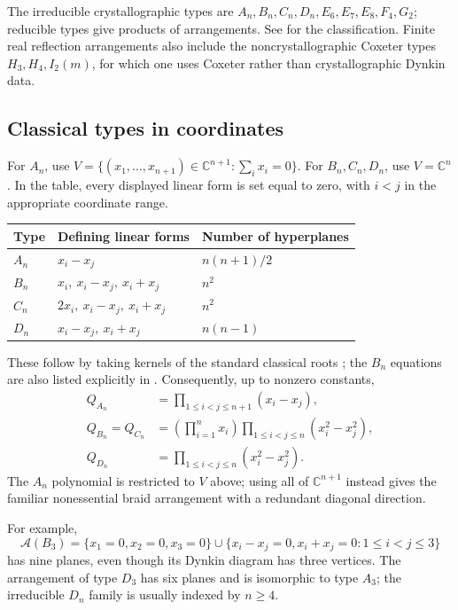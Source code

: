 \documentclass[11pt,a4paper]{article}
\theoremstyle{remark}\newtheorem{remark}[theorem]{Remark}
\newcommand{\C}{\mathbb C}
\newcommand{\A}{\mathcal A}
\begin{document}
The irreducible crystallographic types are
$A_n,B_n,C_n,D_n,E_6,E_7,E_8,F_4,G_2$; reducible types give products
of arrangements.  See \cite[Theorem 23.7]{Etingof} for the classification.
Finite real reflection arrangements also include the noncrystallographic
Coxeter types $H_3,H_4,I_2(m)$, for which one uses Coxeter rather than
crystallographic Dynkin data.

\subsection*{Classical types in coordinates}
For $A_n$, use
$V=\{(x_1,\ldots,x_{n+1})\in\C^{n+1}:\sum_i x_i=0\}$.
For $B_n,C_n,D_n$, use $V=\C^n$.  In the table, every displayed linear
form is set equal to zero, with $i<j$ in the appropriate coordinate range.
\begin{center}
\renewcommand{\arraystretch}{1.2}
\begin{tabular}{lll}
\toprule
Type & Defining linear forms & Number of hyperplanes\\
\midrule
$A_n$ & $x_i-x_j$ & $n(n+1)/2$\\
$B_n$ & $x_i,\ x_i-x_j,\ x_i+x_j$ & $n^2$\\
$C_n$ & $2x_i,\ x_i-x_j,\ x_i+x_j$ & $n^2$\\
$D_n$ & $x_i-x_j,\ x_i+x_j$ & $n(n-1)$\\
\bottomrule
\end{tabular}
\end{center}
These follow by taking kernels of the standard classical roots
\cite[\S20.3]{Etingof}; the $B_n$ equations are also listed explicitly
in \cite{M2B}.  Consequently, up to nonzero constants,
\begin{align*}
Q_{A_n}&=\prod_{1\le i<j\le n+1}(x_i-x_j),\\
Q_{B_n}=Q_{C_n}&=\left(\prod_{i=1}^n x_i\right)
                 \prod_{1\le i<j\le n}(x_i^2-x_j^2),\\
Q_{D_n}&=\prod_{1\le i<j\le n}(x_i^2-x_j^2).
\end{align*}
The $A_n$ polynomial is restricted to $V$ above; using all of
$\C^{n+1}$ instead gives the familiar nonessential braid arrangement
with a redundant diagonal direction.

For example,
\[
\A(B_3)=\{x_1=0,x_2=0,x_3=0\}
\cup\{x_i-x_j=0,x_i+x_j=0:1\le i<j\le3\}
\]
has nine planes, even though its Dynkin diagram has three vertices.
The arrangement of type $D_3$ has six planes and is isomorphic to
type $A_3$; the irreducible $D_n$ family is usually indexed by $n\ge4$.
\end{document}
